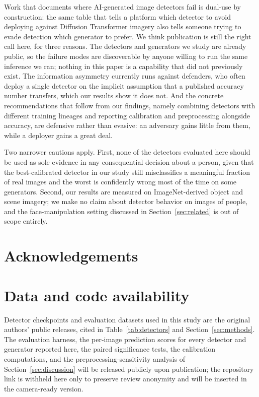 \documentclass[3p,times,procedia]{elsarticle}
\begin{document}
Work that documents where AI-generated image detectors fail is dual-use by
construction: the same table that tells a platform which detector to avoid
deploying against Diffusion Transformer imagery also tells someone trying to
evade detection which generator to prefer. We think publication is still the
right call here, for three reasons. The detectors and generators we study are
already public, so the failure modes are discoverable by anyone willing to run
the same inference we ran; nothing in this paper is a capability that did not
previously exist. The information asymmetry currently runs against defenders,
who often deploy a single detector on the implicit assumption that a published
accuracy number transfers, which our results show it does not. And the
concrete recommendations that follow from our findings, namely combining
detectors with different training lineages and reporting calibration and
preprocessing alongside accuracy, are defensive rather than evasive: an
adversary gains little from them, while a deployer gains a great deal.

Two narrower cautions apply. First, none of the detectors evaluated here
should be used as sole evidence in any consequential decision about a
person, given that the best-calibrated detector in our study still
misclassifies a meaningful fraction of real images and the worst is
confidently wrong most of the time on some generators. Second, our results
are measured on ImageNet-derived object and scene imagery; we make no claim
about detector behavior on images of people, and the face-manipulation
setting discussed in Section~\ref{sec:related} is out of scope entirely.

\section*{Acknowledgements}

\appendix
\section{Data and code availability}
Detector checkpoints and evaluation datasets used in this study are the
original authors' public releases, cited in Table~\ref{tab:detectors} and
Section~\ref{sec:methods}. The evaluation harness, the per-image prediction
scores for every detector and generator reported here, the paired
significance tests, the calibration computations, and the
preprocessing-sensitivity analysis of Section~\ref{sec:discussion} will be
released publicly upon publication; the repository link is withheld here
only to preserve review anonymity and will be inserted in the
camera-ready version.
\end{document}
